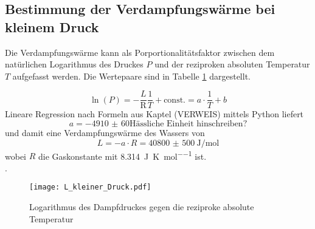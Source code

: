 \subsection{Bestimmung der Verdampfungswärme bei kleinem Druck}
\label{sec:bestimmungverdampfungswarme}
Die Verdampfungswärme kann als Porportionalitätsfaktor zwischen dem natürlichen Logarithmus des Druckes $P$ und der reziproken absoluten Temperatur $T$ aufgefasst werden. Die Wertepaare sind in Tabelle \ref{tab:druck-temperatur} dargestellt.
\begin{figure}
	\centering

\label{tab:druck-temperatur}
\end{figure}

\begin{equation}
\ln(P) = - \frac{L}{\text{R}} \frac{1}{T} + \text{const.} = a \cdot \frac{1}{T} +b
\end{equation}
Lineare Regression nach Formeln aus Kaptel (VERWEIS) mittels Python liefert
\begin{equation}
a= \num{-4910(60)}  \text{Hässliche Einheit hinschreiben?}
\end{equation}
und damit eine Verdampfungswärme des Wassers von
\begin{equation}
L = - a \cdot R = \SI{40800(500)}{\joule\per\mol} 
\end{equation}
wobei $R$ die Gaskonstante mit \SI{8.314}{\joule\per\kelvin\per\mol} ist. \\
.


\begin{figure}[h!]
	\centering
	\texttt{[image: L\_kleiner\_Druck.pdf]}
	\caption{Logarithmus des Dampfdruckes gegen die reziproke absolute Temperatur}
	\label{fig:L_kleiner_Druck}
\end{figure}

